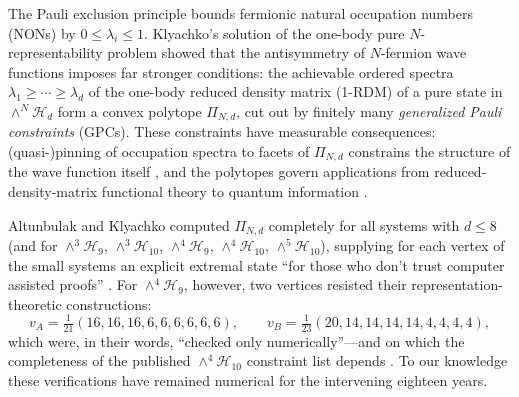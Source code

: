 \documentclass[11pt]{article}
\newcommand{\wedgeN}[2]{\wedge^{#1}\mathcal{H}_{#2}}
\begin{document}
The Pauli exclusion principle bounds fermionic natural occupation numbers
(NONs) by $0 \le \lambda_i \le 1$. Klyachko's solution of the one-body pure
$N$-representability problem \cite{Klyachko2006,AK2008} showed that the
antisymmetry of $N$-fermion wave functions imposes far stronger conditions:
the achievable ordered spectra
$\lambda_1 \ge \cdots \ge \lambda_d$ of the one-body reduced density matrix
(1-RDM) of a pure state in $\wedgeN{N}{d}$ form a convex polytope
$\Pi_{N,d}$, cut out by finitely many \emph{generalized Pauli constraints}
(GPCs). These constraints have measurable consequences: (quasi-)pinning of
occupation spectra to facets of $\Pi_{N,d}$ constrains the structure of the
wave function itself \cite{SGC2013,Liebert2025}, and the polytopes govern
applications from reduced-density-matrix functional theory to quantum
information \cite{Castillo2021,Liebert2025}.

Altunbulak and Klyachko computed $\Pi_{N,d}$ completely for all systems with
$d \le 8$ (and for $\wedge^3\mathcal{H}_9$, $\wedge^3\mathcal{H}_{10}$,
$\wedge^4\mathcal{H}_9$, $\wedge^4\mathcal{H}_{10}$,
$\wedge^5\mathcal{H}_{10}$), supplying for each vertex of the small systems
an explicit extremal state ``for those who don't trust computer assisted
proofs'' \cite{AK2008}. For $\wedge^4\mathcal{H}_9$, however, two vertices
resisted their representation-theoretic constructions:
\begin{equation}
\label{eq:AB}
v_A = \tfrac{1}{21}(16,16,16,6,6,6,6,6,6),
\qquad
v_B = \tfrac{1}{23}(20,14,14,14,14,4,4,4,4),
\end{equation}
which were, in their words, ``checked only numerically''---and on which the
completeness of the published $\wedge^4\mathcal{H}_{10}$ constraint list
depends \cite{AK2008}. To our knowledge these verifications have remained
numerical for the intervening eighteen years.
\end{document}
